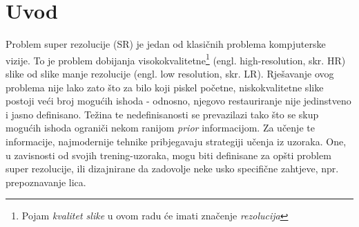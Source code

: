 \documentclass[12pt]{report}
\numberwithin{equation}{section}
\begin{document}
{
{} %
}
\titlep
\prvunutr



\apstrakt
\apstrakten



\doublespacing



\tableofcontents



\listoffigures 
 
\listoftables 

\chapter{Uvod}\label{ch1}


Problem super rezolucije (SR) je jedan od klasičnih problema kompjuterske vizije. To je problem dobijanja visokokvalitetne\footnote{Pojam \textit{kvalitet slike} u ovom radu će imati značenje \textit{rezolucija}} (engl. high-resolution, skr. HR) slike od slike manje rezolucije (engl. low resolution, skr. LR). Rješavanje ovog problema nije lako zato što za bilo koji piskel početne, niskokvalitetne slike postoji veći broj mogućih ishoda - odnosno, njegovo restauriranje nije jedinstveno i jasno definisano. Težina te nedefinisanosti se prevazilazi tako što se skup mogućih ishoda ograniči nekom ranijom \textit{prior} informacijom. Za učenje te informacije, najmodernije tehnike pribjegavaju strategiji učenja iz uzoraka.  One, u zavisnosti od svojih trening-uzoraka, mogu biti definisane za opšti problem super rezolucije, ili dizajnirane da zadovolje neke usko specifične zahtjeve, npr. prepoznavanje lica.     

\end{document}
